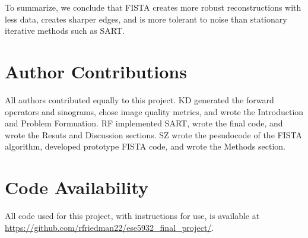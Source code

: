\documentclass[12pt]{article}
\begin{document}
To summarize, we conclude that FISTA creates more robust reconstructions with less data, creates sharper edges, and is more tolerant to noise than stationary iterative methods such as SART.

\section{Author Contributions}
All authors contributed equally to this project. KD generated the forward operators and sinograms, chose image quality metrics, and wrote the Introduction and Problem Formuation. RF implemented SART, wrote the final code, and wrote the Resuts and Discussion sections. SZ wrote the pesudocode of the FISTA algorithm, developed prototype FISTA code, and wrote the Methods section.

\section{Code Availability}
All code used for this project, with instructions for use, is available at \url{https://github.com/rfriedman22/ese5932_final_project/}.
\end{document}
